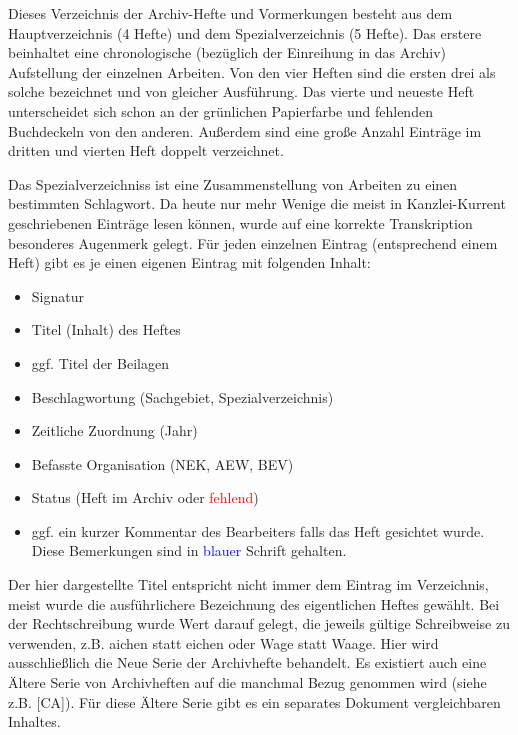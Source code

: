 \documentclass[a4paper]{scrbook}
\begin{document}
Dieses \glqq Verzeichnis der Archiv-Hefte und Vormerkungen\grqq{} besteht aus dem \glqq Hauptverzeichnis\grqq{} (4 Hefte) und dem \glqq{}Spezialverzeichnis\grqq{} (5 Hefte). Das erstere beinhaltet eine chronologische (bezüglich der Einreihung in das Archiv) Aufstellung der einzelnen Arbeiten. Von den vier Heften sind die ersten drei als solche bezeichnet und von gleicher Ausführung. Das vierte und neueste Heft unterscheidet sich schon an der grünlichen Papierfarbe und fehlenden Buchdeckeln von den anderen. Außerdem sind eine große Anzahl Einträge im dritten und vierten Heft doppelt verzeichnet. 

Das Spezialverzeichniss ist eine Zusammenstellung von Arbeiten zu einen bestimmten Schlagwort.
Da heute nur mehr Wenige die meist in Kanzlei-Kurrent geschriebenen Einträge lesen können, wurde auf eine korrekte Transkription besonderes Augenmerk gelegt.  Für jeden einzelnen Eintrag (entsprechend einem Heft) gibt es je einen eigenen Eintrag mit folgenden Inhalt:

\begin{itemize}
\item Signatur
\item Titel (Inhalt) des Heftes
\item ggf. Titel der Beilagen 
\item Beschlagwortung (Sachgebiet, Spezialverzeichnis)
\item Zeitliche Zuordnung (Jahr)
\item Befasste Organisation (NEK, AEW, BEV)
\item Status (Heft im Archiv oder \textcolor{red}{fehlend})
\item ggf. ein kurzer Kommentar des Bearbeiters falls das Heft gesichtet wurde. Diese Bemerkungen sind in \textcolor{blue}{blauer} Schrift gehalten.
\end{itemize}

Der hier dargestellte Titel entspricht nicht immer dem Eintrag im Verzeichnis, meist wurde die ausführlichere Bezeichnung des eigentlichen Heftes gewählt. Bei der Rechtschreibung wurde Wert darauf gelegt, die jeweils gültige Schreibweise zu verwenden, z.B. {\glqq}aichen{\grqq} statt {\glqq}eichen{\grqq} oder {\glqq}Wage{\grqq} statt {\glqq}Waage{\grqq}. Hier wird ausschließlich die {\glqq}Neue Serie{\grqq} der Archivhefte behandelt. Es existiert auch eine {\glqq}Ältere Serie{\grqq} von Archivheften auf die manchmal Bezug genommen wird (siehe z.B. [CA]). Für diese {\glqq}Ältere Serie{\grqq} gibt es ein separates Dokument vergleichbaren Inhaltes. 
\end{document}
